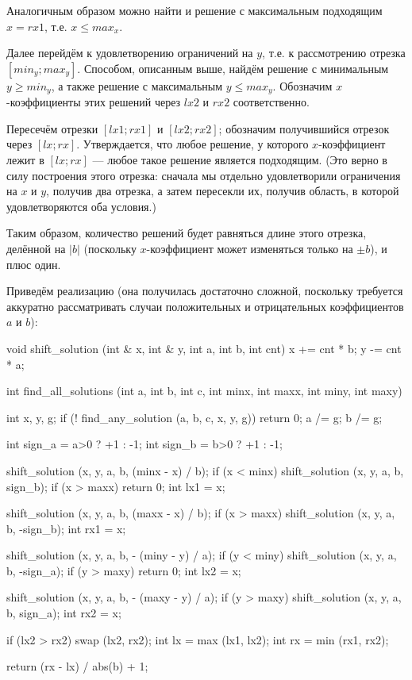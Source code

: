 Аналогичным образом можно найти и решение с максимальным подходящим $x=rx1$, т.е. $x \le max_x$.

Далее перейдём к удовлетворению ограничений на $y$, т.е. к рассмотрению отрезка $[min_y;max_y]$. Способом, описанным выше, найдём решение с минимальным $y \ge min_y$, а также решение с максимальным $y \le max_y$. Обозначим $x$-коэффициенты этих решений через $lx2$ и $rx2$ соответственно.

Пересечём отрезки $[lx1;rx1]$ и $[lx2;rx2]$; обозначим получившийся отрезок через $[lx;rx]$. Утверждается, что любое решение, у которого $x$-коэффициент лежит в $[lx;rx]$ --- любое такое решение является подходящим. (Это верно в силу построения этого отрезка: сначала мы отдельно удовлетворили ограничения на $x$ и $y$, получив два отрезка, а затем пересекли их, получив область, в которой удовлетворяются оба условия.)

Таким образом, количество решений будет равняться длине этого отрезка, делённой на $|b|$ (поскольку $x$-коэффициент может изменяться только на $\pm b$), и плюс один.

Приведём реализацию (она получилась достаточно сложной, поскольку требуется аккуратно рассматривать случаи положительных и отрицательных коэффициентов $a$ и $b$):

\code
void shift_solution (int & x, int & y, int a, int b, int cnt) {
	x += cnt * b;
	y -= cnt * a;
}

int find_all_solutions (int a, int b, int c, int minx, int maxx, int miny, int maxy) {
	int x, y, g;
	if (! find_any_solution (a, b, c, x, y, g))
		return 0;
	a /= g;  b /= g;

	int sign_a = a>0 ? +1 : -1;
	int sign_b = b>0 ? +1 : -1;

	shift_solution (x, y, a, b, (minx - x) / b);
	if (x < minx)
		shift_solution (x, y, a, b, sign_b);
	if (x > maxx)
		return 0;
	int lx1 = x;

	shift_solution (x, y, a, b, (maxx - x) / b);
	if (x > maxx)
		shift_solution (x, y, a, b, -sign_b);
	int rx1 = x;

	shift_solution (x, y, a, b, - (miny - y) / a);
	if (y < miny)
		shift_solution (x, y, a, b, -sign_a);
	if (y > maxy)
		return 0;
	int lx2 = x;

	shift_solution (x, y, a, b, - (maxy - y) / a);
	if (y > maxy)
		shift_solution (x, y, a, b, sign_a);
	int rx2 = x;

	if (lx2 > rx2)
		swap (lx2, rx2);
	int lx = max (lx1, lx2);
	int rx = min (rx1, rx2);

	return (rx - lx) / abs(b) + 1;
}
\endcode

